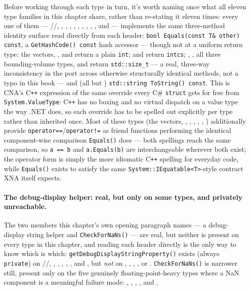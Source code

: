 Before working through each type in turn, it's worth naming once what all eleven type
families in this chapter share, rather than re-stating it eleven times: every one of them ---
//, ,
, , , ,
, , ,
, and  --- implements the same three-method
identity surface read directly from each header: \texttt{bool Equals(const T\& other) const},
a \texttt{GetHashCode() const} hash accessor --- though not at a uniform return type: the
vectors, , and  return a plain \texttt{int};
 and  return \texttt{intcs}; ,
, all three bounding-volume types, and  return
\texttt{std::size\_t} --- a real, three-way inconsistency in the port across otherwise
structurally identical methods, not a typo in this book --- and (all but )
\texttt{std::string ToString() const}. This is CNA's C\texttt{++}
expression of the same override every C\# \texttt{struct} gets for free from
\texttt{System.ValueType}: C\texttt{++} has no boxing and no virtual dispatch on a value type
the way .NET does, so each override has to be spelled out explicitly per type rather than
inherited once. Most of these types (the vectors, , ,
, , , ) additionally provide
\texttt{operator==}/\texttt{operator!=} as friend functions performing the identical
component-wise comparison \texttt{Equals()} does --- both spellings reach the same comparison,
so \texttt{a == b} and \texttt{a.Equals(b)} are interchangeable wherever both exist; the
operator form is simply the more idiomatic C\texttt{++} spelling for everyday code, while
\texttt{Equals()} exists to satisfy the same \texttt{System::IEquatable<T>}-style contract XNA
itself expects.

\paragraph{The debug-display helper: real, but only on some types, and privately unreachable.}
The two members this chapter's own opening paragraph names --- a debug-display string helper
and \texttt{CheckForNaNs()} --- are real, but neither is present on every type in this chapter,
and reading each header directly is the only way to know which is which:
\texttt{getDebugDisplayStringProperty()} exists (always \texttt{private}) on
//, ,
, , , , and
, but \emph{not} on , ,
, , or . \texttt{CheckForNaNs()} is
narrower still, present only on the five genuinely floating-point-heavy types where a NaN
component is a meaningful failure mode: , ,
, , and .

